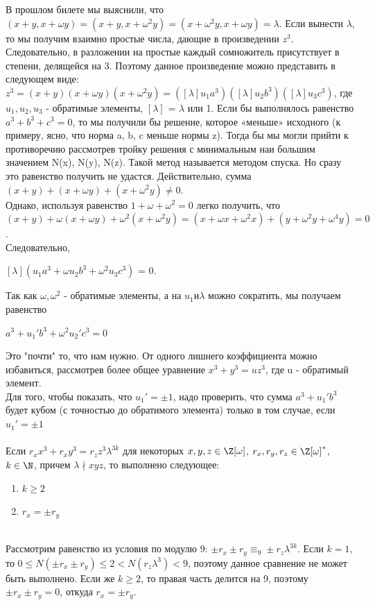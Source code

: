 В прошлом билете мы выяснили, что $(x + y, x + \omega y) = (x + y, x + \omega^2 y) = (x + \omega^2y, x + \omega y) = \lambda$. Если
 вынести $\lambda$, то мы получим взаимно простые числа, дающие в произведении $z^3$. Следовательно, в разложении на простые каждый сомножитель присутствует в степени, делящейся на 3. Поэтому данное произведение можно представить в следующем виде: $z^3 = (x + y)(x + \omega y)(x + \omega^2y) = ([\lambda]u_1a^3)([\lambda]u_2b^3)([\lambda]u_3c^3)$, где $u_1, u_2, u_3$ - обратимые элементы, $[\lambda]$ = $\lambda$ или 1.
Если бы выполнялось равенство $a^3 + b^3 + c^3 = 0$, то мы получили бы решение, которое «меньше» исходного (к примеру, ясно,
что норма a, b, c меньше нормы z). Тогда бы мы могли прийти к
противоречию рассмотрев тройку решения с минимальным наи
большим значением N(x), N(y), N(z). Такой метод называется методом спуска. Но сразу это равенство получить не удастся.
Действительно, сумма $(x + y) + (x + \omega y) + (x + \omega^2y) \neq 0$. 
\\
Однако, используя равенство $1 + \omega + \omega^2 = 0$ легко получить, что $(x+y)+\omega(x+\omega y)+\omega^2(x+\omega^2y) = (x+\omega x+\omega^2x)+(y+\omega^2y+\omega^4y) = 0$.\\
Следовательно,
\begin{center}
    $[\lambda](u_1a^3 + \omega u_2b^3 + \omega^2 u_3c^3)$ = 0.
\end{center}
Так как $\omega, \omega^2$ - обратимые элементы, а на $u_1 и \lambda$ можно сократить, мы получаем равенство
\begin{center}
    $a^3 +  u_1'b^3 +
     \omega^2 u_2'c^3 = 0$
\end{center}
Это "почти" то, что нам нужно. От одного лишнего коэффициента можно избавиться, рассмотрев более общее уравнение
$x^3 + y^3 = u z^3$, где u - обратимый элемент.
\\
Для того, чтобы показать, что $u_1' = \pm1$, надо проверить, что сумма  $a^3 +  u_1'b^3$ будет кубом (с точностью до обратимого элемента)
только в том случае, если $u_1' = \pm1$
\\
\\
\Lemma
	Если $r_xx^3 + r_xy^3 = r_zz^3\lambda^{3k}$ для некоторых $x, y, z \in \Z[\omega]$, $r_x, r_y, r_z \in \Z[\omega]^*$, $k \in \N$, причем $\lambda \nmid xyz$, то выполнено следующее:
	\begin{enumerate}
		\item $k \ge 2$
		\item $r_x = \pm r_y$
	\end{enumerate}

\\
\Proof
	Рассмотрим равенство из условия по модулю 9: $\pm r_x \pm r_y \equiv_9 \pm r_z\lambda^{3k}$. Если $k = 1$, то $0 \le N(\pm r_x \pm r_y) \le 2 < N(r_z\lambda^{3})< 9$, поэтому данное сравнение не может быть выполнено. Если же $k \ge 2$, то правая часть делится на 9, поэтому $\pm r_x \pm r_y = 0$, откуда $r_x = \pm r_y$.
\EndProof
